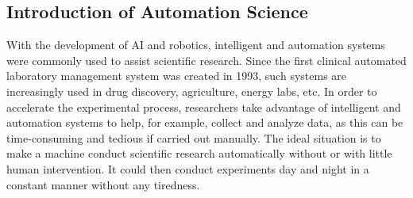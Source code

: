 \subsection{Introduction of Automation Science}

With the development of AI and robotics, intelligent and automation systems were commonly used to assist scientific research. Since the first clinical automated laboratory management system \cite{Steinlechner2001} was created in 1993, such systems are increasingly used in drug discovery, agriculture, energy labs, etc. In order to accelerate the experimental process, researchers take advantage of intelligent and automation systems to help, for example, collect and analyze data, as this can be time-consuming and tedious if carried out manually. The ideal situation is to make a machine conduct scientific research automatically without or with little human intervention. It could then conduct experiments day and night in a constant manner without any tiredness.
          
